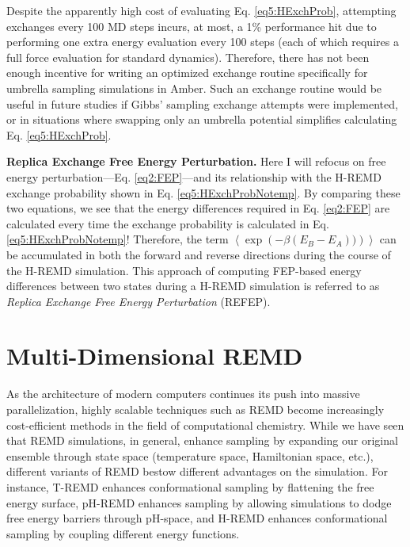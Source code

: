 Despite the apparently high cost of evaluating Eq. \ref{eq5:HExchProb},
attempting exchanges every 100 MD steps incurs, at most, a 1\% performance hit
due to performing one extra energy evaluation every 100 steps (each of which
requires a full force evaluation for standard dynamics). Therefore, there has
not been enough incentive for writing an optimized exchange routine specifically
for umbrella sampling simulations in Amber. Such an exchange routine would be
useful in future studies if Gibbs' sampling exchange attempts were implemented,
\cite{Chodera_JChemPhys_2011_v135_p194110} or in situations where swapping only
an umbrella potential simplifies calculating Eq. \ref{eq5:HExchProb}.

\textbf{Replica Exchange Free Energy Perturbation.} Here I will refocus on free
energy perturbation---Eq. \ref{eq2:FEP}---and its relationship with the H-REMD
exchange probability shown in Eq. \ref{eq5:HExchProbNotemp}. By comparing these
two equations, we see that the energy differences required in Eq. \ref{eq2:FEP}
are calculated every time the exchange probability is calculated in Eq.
\ref{eq5:HExchProbNotemp}!  Therefore, the term
$\left\langle\exp\left(-\beta(E_B-E_A))\right)\right\rangle$ can be accumulated
in both the forward and reverse directions during the course of the H-REMD
simulation. This approach of computing FEP-based energy differences between two
states during a H-REMD simulation is referred to as \emph{Replica Exchange Free
Energy Perturbation} (REFEP). \cite{Meng_JChemTheoryComput_2011_v7_p2721,
Jiang_JChemTheoryComput_2010_v6_p2559}

\section{Multi-Dimensional REMD}

As the architecture of modern computers continues its push into massive
parallelization, highly scalable techniques such as REMD become increasingly
cost-efficient methods in the field of computational chemistry. While we have
seen that REMD simulations, in general, enhance sampling by expanding our
original ensemble through state space (\eg temperature space, Hamiltonian space,
etc.), different variants of REMD bestow different advantages on the simulation.
For instance, T-REMD enhances conformational sampling by flattening the free
energy surface, pH-REMD enhances sampling by allowing simulations to dodge free
energy barriers through pH-space, and H-REMD enhances conformational sampling by
coupling different energy functions.

